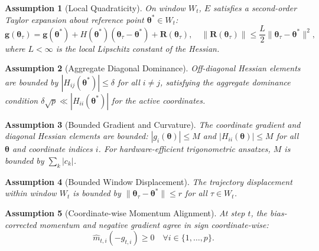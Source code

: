 \documentclass[11pt,a4paper]{article}
\newtheorem{assumption}{Assumption}
\begin{document}
\begin{assumption}[Local Quadraticity]
\label{ass:quadraticity}
On window $W_t$, $E$ satisfies a second-order Taylor expansion about reference point $\boldsymbol{\theta}^* \in W_t$:
\begin{equation}
\mathbf{g}(\boldsymbol{\theta}_\tau) = \mathbf{g}(\boldsymbol{\theta}^*) + H(\boldsymbol{\theta}^*)(\boldsymbol{\theta}_\tau - \boldsymbol{\theta}^*) + \mathbf{R}(\boldsymbol{\theta}_\tau), \quad \|\mathbf{R}(\boldsymbol{\theta}_\tau)\| \le \frac{L}{2} \|\boldsymbol{\theta}_\tau - \boldsymbol{\theta}^*\|^2,
\end{equation}
where $L < \infty$ is the local Lipschitz constant of the Hessian.
\end{assumption}

\begin{assumption}[Aggregate Diagonal Dominance]
\label{ass:diag_dominance}
Off-diagonal Hessian elements are bounded by $|H_{ij}(\boldsymbol{\theta}^*)| \le \delta$ for all $i \ne j$, satisfying the aggregate dominance condition $\delta \sqrt{p} \ll |H_{ii}(\boldsymbol{\theta}^*)|$ for the active coordinates.
\end{assumption}

\begin{assumption}[Bounded Gradient and Curvature]
\label{ass:bounded_curvature}
The coordinate gradient and diagonal Hessian elements are bounded: $|g_i(\boldsymbol{\theta})| \le M$ and $|H_{ii}(\boldsymbol{\theta})| \le M$ for all $\boldsymbol{\theta}$ and coordinate indices $i$. For hardware-efficient trigonometric ansatzes, $M$ is bounded by $\sum_k |c_k|$.
\end{assumption}

\begin{assumption}[Bounded Window Displacement]
\label{ass:displacement}
The trajectory displacement within window $W_t$ is bounded by $\|\boldsymbol{\theta}_\tau - \boldsymbol{\theta}^*\| \le r$ for all $\tau \in W_t$.
\end{assumption}

\begin{assumption}[Coordinate-wise Momentum Alignment]
\label{ass:alignment}
At step $t$, the bias-corrected momentum and negative gradient agree in sign coordinate-wise:
\begin{equation}
\hat{m}_{t,i} (-g_{t,i}) \ge 0 \quad \forall i \in \{1, \dots, p\}.
\end{equation}
\end{assumption}
\end{document}
